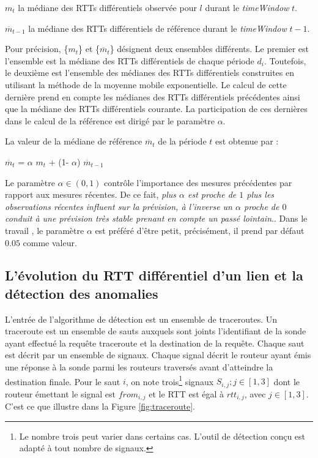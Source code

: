 $m_t$ la médiane des RTTs différentiels observée pour $l$ durant le \textit{timeWindow} $t$. 

$ \overline{m}_{t-1}$  la médiane des  RTTs différentiels  de référence durant le \textit{timeWindow} $ t-1 $.  



Pour précision, \{$m_t$\} et \{$ \overline{m}_{t}$\} désignent deux ensembles différents. Le premier est l'ensemble est la médiane des RTTs différentiels de chaque période $d_i$. Toutefois, le deuxième est l'ensemble des médianes des RTTs différentiels construites en utilisant la méthode de la moyenne mobile exponentielle. Le calcul de cette dernière prend en compte les médianes des RTTs différentiels précédentes ainsi que la médiane des RTTs différentiels courante. La participation de ces dernières dans le calcul de la référence est dirigé par le paramètre $\alpha$.

La  valeur de la médiane de référence  $ \overline{m}_{t}$ de la période $t$ est obtenue par : 

\begin{center}
	$ \overline{m}_{t}$ =  $\alpha$ ${m}_{t}$ + (1-  $\alpha$) $ \overline{m}_{t-1}$
\end{center}

Le paramètre  $\alpha \in (0, 1)$  contrôle l'importance  des mesures précédentes par rapport aux mesures récentes. De ce fait, \guillemotleft \textit{plus $\alpha$ est proche de $ 1 $ plus les observations récentes influent sur la prévision, à l'inverse un $\alpha$ proche de $0$ conduit à une prévision très stable prenant en compte un passé lointain}.\guillemotright\cite{Lissages-Exponentiels}.  Dans le travail \cite{DBLP:journals/corr/FontugneAPB16}, le paramètre $\alpha$ est préféré d'être petit, précisément, il prend par défaut $0.05$ comme valeur.

\subsection{L'évolution du RTT différentiel d'un lien et  la détection des anomalies} \label{rttevolution}


L'entrée de l'algorithme de détection est un ensemble de traceroutes. Un traceroute  est un ensemble de sauts auxquels sont joints l'identifiant de la sonde ayant effectué la requête traceroute et la destination de la requête. Chaque saut est décrit par un ensemble de signaux.  Chaque signal décrit le routeur ayant émis une réponse à la sonde parmi les routeurs traversés avant d'atteindre la destination finale.  Pour le saut $i$, on note trois\footnote{Le nombre trois peut varier dans certains cas. L'outil de détection conçu est adapté à tout nombre de signaux.} signaux $S_{i, j}; j\in [1,3]$ dont le routeur émettant le signal est $from_{i,j}$ et le RTT est égal à $rtt_{i,j}$, avec $j \in [1,3]$. C'est ce que   illustre dans la Figure \ref{fig:traceroute}.

